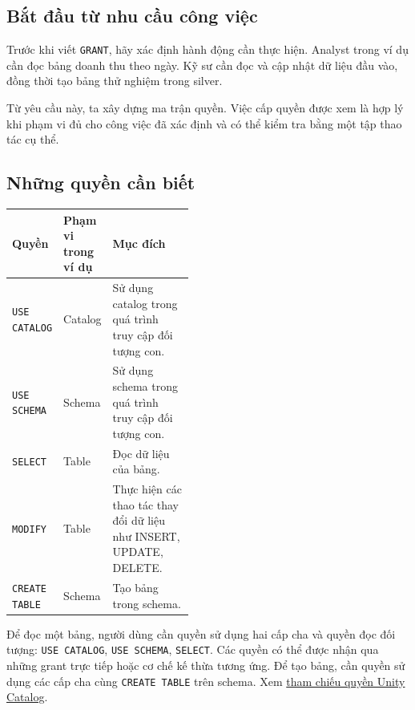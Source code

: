 \FloatBarrier
{}
\subsection{Bắt đầu từ nhu cầu công việc}

Trước khi viết \texttt{GRANT}, hãy xác định hành động cần thực hiện. Analyst trong ví dụ cần đọc bảng doanh thu theo ngày. Kỹ sư cần đọc và cập nhật dữ liệu đầu vào, đồng thời tạo bảng thử nghiệm trong silver.


Từ yêu cầu này, ta xây dựng ma trận quyền. Việc cấp quyền được xem là hợp lý khi phạm vi đủ cho công việc đã xác định và có thể kiểm tra bằng một tập thao tác cụ thể.


\FloatBarrier
{}
\subsection{Những quyền cần biết}

\begin{table}[H]
\small
\renewcommand{\arraystretch}{1.25}
\begin{tabularx}{\linewidth}{@{}p{0.23\linewidth}p{0.22\linewidth}Y@{}}
\toprule
{}
\textbf{Quyền} & \textbf{Phạm vi trong ví dụ} & \textbf{Mục đích} \\
\midrule
\texttt{USE CATALOG} & Catalog & Sử dụng catalog trong quá trình truy cập đối tượng con. \\
\texttt{USE SCHEMA} & Schema & Sử dụng schema trong quá trình truy cập đối tượng con. \\
\texttt{SELECT} & Table & Đọc dữ liệu của bảng. \\
\texttt{MODIFY} & Table & Thực hiện các thao tác thay đổi dữ liệu như INSERT, UPDATE, DELETE. \\
\texttt{CREATE TABLE} & Schema & Tạo bảng trong schema. \\
\bottomrule
\end{tabularx}
\end{table}


Để đọc một bảng, người dùng cần quyền sử dụng hai cấp cha và quyền đọc đối tượng: \texttt{USE CATALOG}, \texttt{USE SCHEMA}, \texttt{SELECT}. Các quyền có thể được nhận qua những grant trực tiếp hoặc cơ chế kế thừa tương ứng. Để tạo bảng, cần quyền sử dụng các cấp cha cùng \texttt{CREATE TABLE} trên schema. Xem \href{https://docs.databricks.com/aws/en/data-governance/unity-catalog/access-control/privileges-reference}{tham chiếu quyền Unity Catalog}.


